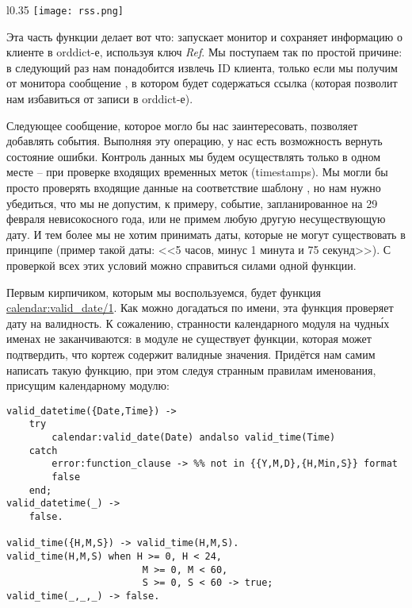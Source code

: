 \begin{wrapfigure}{l}{0.35\linewidth}
    \texttt{[image: rss.png]}
\end{wrapfigure}

Эта часть функции  делает вот что: запускает монитор и сохраняет информацию о клиенте в orddict\--е, используя ключ \emph{Ref}.
Мы поступаем так по простой причине: в следующий раз нам понадобится извлечь ID клиента, только если мы получим от монитора сообщение , в котором будет содержаться ссылка (которая позволит нам избавиться от записи в orddict\--е).

Следующее сообщение, которое могло бы нас заинтересовать, позволяет добавлять события.
Выполняя эту операцию, у нас есть возможность вернуть состояние ошибки.
Контроль данных мы будем осуществлять только в одном месте \--- при проверке входящих временных меток (timestamps).
Мы могли бы просто проверять входящие данные на соответствие шаблону , но нам нужно убедиться, что мы не допустим, к примеру, событие, запланированное на 29 февраля невисокосного года, или не примем любую другую несуществующую дату.
И тем более мы не хотим принимать даты, которые не могут существовать в принципе (пример такой даты: <<5 часов, минус 1 минута и 75 секунд>>).
С проверкой всех этих условий можно справиться силами одной функции.

Первым кирпичиком, которым мы воспользуемся, будет функция \href{http://erldocs.com/R15B/stdlib/calendar.html#valid\_date/1}{calendar:valid\_date/1}.
Как можно догадаться по имени, эта функция проверяет дату на валидность.
К сожалению, странности календарного модуля на чудн\'{ы}х именах не заканчиваются: в модуле не существует функции, которая может подтвердить, что кортеж  содержит валидные значения.
Придётся нам самим написать такую функцию, при этом следуя странным правилам именования, присущим календарному модулю:
\begin{lstlisting}[style=erlang]
valid_datetime({Date,Time}) ->
    try
        calendar:valid_date(Date) andalso valid_time(Time)
    catch
        error:function_clause -> %% not in {{Y,M,D},{H,Min,S}} format
        false
    end;
valid_datetime(_) ->
    false.
 
valid_time({H,M,S}) -> valid_time(H,M,S).
valid_time(H,M,S) when H >= 0, H < 24,
                        M >= 0, M < 60,
                        S >= 0, S < 60 -> true;
valid_time(_,_,_) -> false.
\end{lstlisting}

